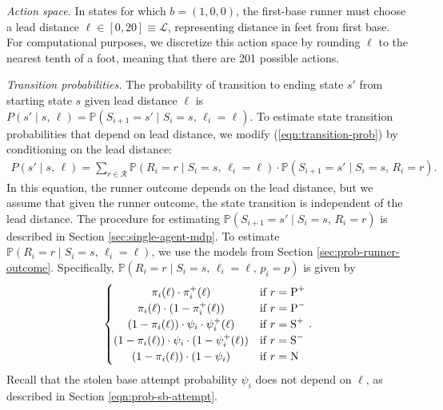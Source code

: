 \documentclass{article}
\begin{document}
        {\it Action space.} In states for which $b = (1, 0, 0)$, the first-base runner must choose a lead distance $\ell \in [0, 20] \equiv \mathcal{L}$, representing distance in feet from first base. For computational purposes, we discretize this action space by rounding $\ell$ to the nearest tenth of a foot, meaning that there are 201 possible actions.
  
        {\it Transition probabilities.} The probability of transition to ending state $s'$ from starting state $s$ given lead distance $\ell$ is $P(s' \mid s,\, \ell) = \mathbb{P}(S_{i+1} = s' \mid S_i = s,\, \ell_i = \ell)$. To estimate state transition probabilities that depend on lead distance, we modify (\ref{eqn:transition-prob}) by conditioning on the lead distance:
        \begin{align}
          \label{eqn:transition-prob-lead}
          P(s' \mid s,\, \ell) = \sum_{r \in \mathcal{R}} \mathbb{P}(R_i = r \mid S_i = s,\, \ell_i = \ell) \cdot \mathbb{P}(S_{i+1} = s' \mid S_i = s,\, R_i = r).
        \end{align}
        In this equation, the runner outcome depends on the lead distance, but we assume that given the runner outcome, the state transition is independent of the lead distance. The procedure for estimating $\mathbb{P}(S_{i+1} = s' \mid S_i = s,\, R_i = r)$ is described in Section \ref{sec:single-agent-mdp}. To estimate $\mathbb{P}(R_i = r \mid S_i = s,\, \ell_i = \ell)$, we use the models from Section \ref{sec:prob-runner-outcome}. Specifically, $\mathbb{P}(R_i = r \mid S_i = s,\, \ell_i = \ell,\, p_i = p)$ is given by
        \begin{align*}
          \begin{cases}
              \hfil \pi_i(\ell) \cdot \pi_i^+(\ell)                             & \mbox{if } r = \mbox{P}^+\\
              \hfil \pi_i(\ell) \cdot (1 - \pi_i^+(\ell))                       & \mbox{if } r = \mbox{P}^-\\
              \hfil (1 - \pi_i(\ell)) \cdot \psi_i \cdot \psi_i^+(\ell)         & \mbox{if } r = \mbox{S}^+\\
              \hfil (1 - \pi_i(\ell)) \cdot \psi_i \cdot (1 - \psi_i^+(\ell))   & \mbox{if } r = \mbox{S}^-\\
              \hfil (1 - \pi_i(\ell)) \cdot (1 - \psi_i)                        & \mbox{if } r = \mbox{N}\\
          \end{cases}.
        \end{align*}
        Recall that the stolen base attempt probability $\psi_i$ does not depend on $\ell$, as described in Section \ref{eqn:prob-sb-attempt}.
  
\end{document}
